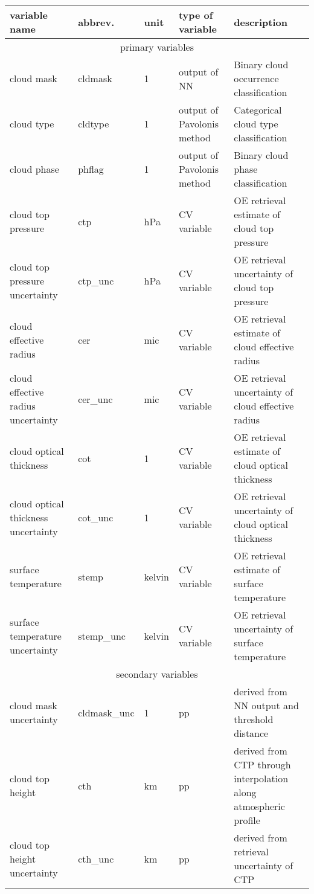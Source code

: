 \begin{table*}[h]
  \caption{CC4CL primary and secondary output. NN = neural network. CV = control vector. pp = postprocessed}
  \begin{tabular}{l|l|l|l|l}
    \hline
    variable name & abbrev. & unit & type of variable & description \\
    \hline
    \multicolumn{5}{c}{primary variables} \\
    \hline
    cloud mask & cldmask & 1 & output of NN & Binary cloud occurrence classification \\
    cloud type & cldtype & 1 & output of Pavolonis method & Categorical cloud type classification \\
    cloud phase & phflag & 1 & output of Pavolonis method & Binary cloud phase classification \\
    cloud top pressure & ctp & hPa & CV variable & OE retrieval estimate of cloud top pressure \\
    cloud top pressure uncertainty & ctp\_unc & hPa & CV variable & OE retrieval uncertainty of cloud top pressure \\
    cloud effective radius & cer & mic & CV variable & OE retrieval estimate of cloud effective radius \\
    cloud effective radius uncertainty & cer\_unc & mic & CV variable & OE retrieval uncertainty of cloud effective radius\\
    cloud optical thickness & cot & 1 & CV variable & OE retrieval estimate of cloud optical thickness \\
    cloud optical thickness uncertainty & cot\_unc & 1 & CV variable & OE retrieval uncertainty of cloud optical thickness \\
    surface temperature & stemp & kelvin & CV variable & OE retrieval estimate of surface temperature \\
    surface temperature uncertainty & stemp\_unc & kelvin & CV variable & OE retrieval uncertainty of surface temperature\\
    \hline
    \multicolumn{5}{c}{secondary variables} \\
    \hline
    cloud mask uncertainty & cldmask\_unc & 1 & pp & derived from NN output and threshold distance \\
    cloud top height & cth & km & pp & derived from CTP through interpolation along atmospheric profile \\
    cloud top height uncertainty & cth\_unc & km & pp & derived from retrieval uncertainty of CTP \\

\end{tabular}
\end{table*}
